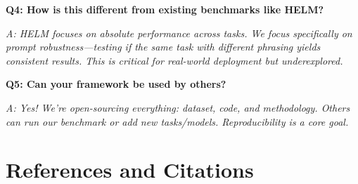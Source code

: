\documentclass[11pt,a4paper]{article}
\begin{document}
\vspace{0.3cm}

\textbf{Q4: How is this different from existing benchmarks like HELM?}

\textit{A: HELM focuses on absolute performance across tasks. We focus specifically on prompt robustness—testing if the same task with different phrasing yields consistent results. This is critical for real-world deployment but underexplored.}

\vspace{0.3cm}

\textbf{Q5: Can your framework be used by others?}

\textit{A: Yes! We're open-sourcing everything: dataset, code, and methodology. Others can run our benchmark or add new tasks/models. Reproducibility is a core goal.}

\section{References and Citations}
\end{document}
